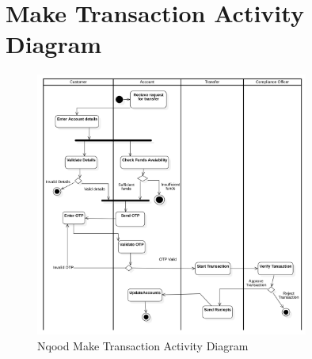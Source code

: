 \documentclass[a4paper]{report}
\begin{document}
\section{Make Transaction Activity Diagram}

\begin{figure}[h!]
    \centering
    \includegraphics[width=0.8\textwidth]{images/nqood-make-tx-activity-diagram.png}
    \caption{Nqood Make Transaction Activity Diagram}
    \label{fig:nqood-make-transaction-activity-diagram}
\end{figure}
\end{document}
